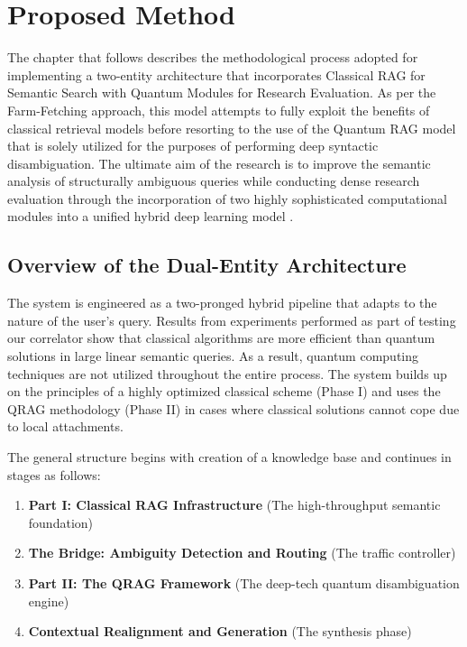 \chapter{Proposed Method}

The chapter that follows describes the methodological process adopted for implementing a two-entity architecture that incorporates Classical RAG for Semantic Search with Quantum Modules for Research Evaluation. As per the Farm-Fetching approach, this model attempts to fully exploit the benefits of classical retrieval models before resorting to the use of the Quantum RAG model that is solely utilized for the purposes of performing deep syntactic disambiguation. The ultimate aim of the research is to improve the semantic analysis of structurally ambiguous queries while conducting dense research evaluation through the incorporation of two highly sophisticated computational modules into a unified hybrid deep learning model \cite{das2025hybrid, resch2021quantum}.

\section{Overview of the Dual-Entity Architecture}

The system is engineered as a two-pronged hybrid pipeline that adapts to the nature of the user’s query. Results from experiments performed as part of testing our correlator show that classical algorithms are more efficient than quantum solutions in large linear semantic queries. As a result, quantum computing techniques are not utilized throughout the entire process. The system builds up on the principles of a highly optimized classical scheme (Phase I) and uses the QRAG methodology (Phase II) in cases where classical solutions cannot cope due to local attachments.

The general structure begins with creation of a knowledge base and continues in stages as follows:
\begin{enumerate}
	\item \textbf{Part I: Classical RAG Infrastructure} (The high-throughput semantic foundation)
	\item \textbf{The Bridge: Ambiguity Detection and Routing} (The traffic controller)
	\item \textbf{Part II: The QRAG Framework} (The deep-tech quantum disambiguation engine)
	\item \textbf{Contextual Realignment and Generation} (The synthesis phase)
\end{enumerate}

